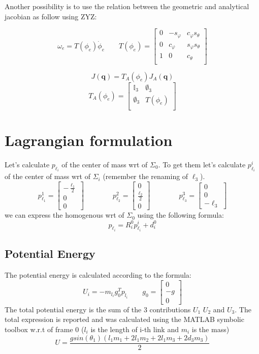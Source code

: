 \documentclass[a4paper,12pt]{article}
\renewcommand*{\l}{\ell}
\newcommand*{\I}{\mathbb{I}}
\newcommand*{\q}{\bm{q}}
\begin{document}
\noindent Another possibility is to use the relation between the geometric and analytical jacobian as follow using ZYZ:

\[
\omega_e = T(\phi_e)\dot{\phi}_e
\qquad
T(\phi_e) = \begin{bmatrix}
    0 & -s_\varphi & c_\varphi s_\theta \\
    0 &  c_\varphi & s_\varphi s_\theta \\
    1 &          0 &           c_\theta \\
\end{bmatrix}
\]

\[
J(\q) = T_A(\phi_e) J_A(\q)
\]
\[
T_A(\phi_e) = \begin{bmatrix}
    \I_3 & \emptyset_3 \\ 
\emptyset_3 &     T(\phi_e) \\
\end{bmatrix}
\]

\section{Lagrangian formulation}
Let's calculate $p_{\l_i}$ of the center of mass wrt of $\Sigma_0$. To get them let's calculate $p^i_{\l_i}$ of the center of mass wrt of $\Sigma_i$ (remember the renaming of $\l_3$).
\[
p_{\l_1}^{1} = \begin{bmatrix}  - \frac{\l_1}{2} \\ 0 \\ 0 \end{bmatrix}
\qquad
\qquad
p_{\l_2}^{2} = \begin{bmatrix} 0 \\ \frac{\l_2}{2} \\ 0 \end{bmatrix}
\qquad
\qquad
p_{\l_3}^{3} = \begin{bmatrix} 0 \\ 0 \\  - \l_3 \end{bmatrix}
\]
we can express the homogenous wrt of $\Sigma_0$ using the following formula: 
\[
p_{\l_i} = R^0_i p_{\l_i}^{i}  +  d^0_i
\] 

\subsection{Potential Energy}
The potential energy is calculated according to the formula:
\[
    U_i = -m_{l_i}g_0^{T}p_{l_i}
    \qquad
    g_0 = \begin{bmatrix}
        0\\ -g \\ 0
    \end{bmatrix}
\]
\noindent The total potential energy is the sum of the 3 contributions $U_1$ $U_2$ and $U_3$. The total expression is reported and was calculated using the MATLAB symbolic toolbox w.r.t of frame 0 ($l_{i}$ is the length of i-th link and $m_i$ is the mass)
\[
    U = \frac{gsin(\theta_1)(l_{1}m_1 + 2l_{1}m_2 + 2l_{1}m_3 + 2d_3m_3)}{2}  
\]
\end{document}
